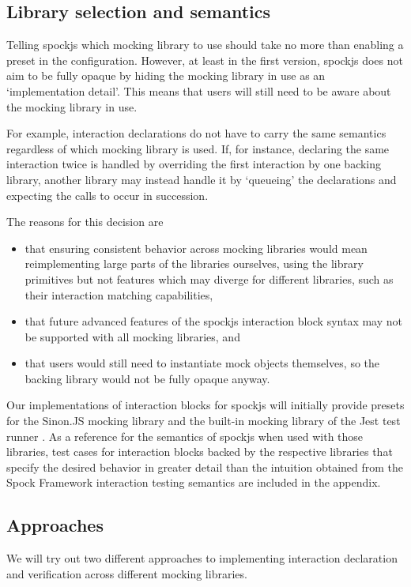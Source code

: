 \subsection{Library selection and semantics}
Telling spockjs which mocking library to use should
take no more than enabling a preset in the configuration.
However, at least in the first version,
spockjs does not aim to be fully opaque
by hiding the mocking library in use as an `implementation detail'.
This means that users will still need to be aware
about the mocking library in use.

For example, interaction declarations
do not have to carry the same semantics
regardless of which mocking library is used.
If, for instance, declaring the same interaction twice
is handled by overriding the first interaction by one backing library,
another library may instead handle it by `queueing' the declarations
and expecting the calls to occur in succession.

The reasons for this decision are
\begin{itemize}
  \item that ensuring consistent behavior across mocking libraries would mean
    reimplementing large parts of the libraries ourselves,
    using the library primitives but not features
    which may diverge for different libraries,
    such as their interaction matching capabilities,
  \item that future advanced features of the spockjs interaction block syntax
    may not be supported with all mocking libraries, and
  \item that users would still need to instantiate mock objects themselves,
    so the backing library would not be fully opaque anyway.
\end{itemize}

Our implementations of interaction blocks for spockjs will initially
provide presets for the Sinon.JS mocking library \autocite{SinonGithub}
and the built-in mocking library of the Jest test runner \autocite{JestGithub}.
As a reference for the semantics of spockjs when used with those libraries,
test cases for interaction blocks backed by the respective libraries
that specify the desired behavior in greater detail
than the intuition obtained from the Spock Framework interaction testing semantics
are included in the appendix.

\subsection{Approaches}
We will try out two different approaches to
implementing interaction declaration and verification
across different mocking libraries.

